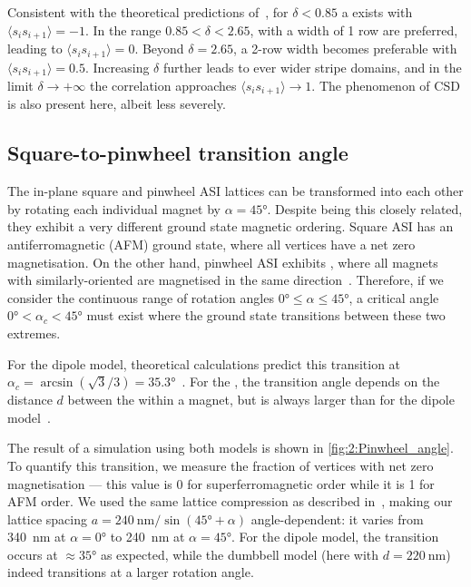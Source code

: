 Consistent with the theoretical predictions of~, for $\delta < 0.85$ a  exists with $\langle s_i s_{i+1} \rangle = -1$.
In the range $0.85 < \delta < 2.65$,  with a width of 1 row are preferred, leading to $\langle s_i s_{i+1} \rangle = 0$.
Beyond $\delta=2.65$, a 2-row width becomes preferable with $\langle s_i s_{i+1} \rangle = 0.5$.
Increasing $\delta$ further leads to ever wider stripe domains, and in the limit $\delta \rightarrow +\infty$ the correlation approaches $\langle s_i s_{i+1} \rangle \rightarrow 1$.
The phenomenon of CSD is also present here, albeit less severely.

\subsection{Square-to-pinwheel transition angle}\label{sec:2:Verification_IP_SquarePinwheel}
The in-plane square and pinwheel ASI lattices can be transformed into each other by rotating each individual magnet by $\alpha = \ang{45}$.
Despite being this closely related, they exhibit a very different ground state magnetic ordering.
Square ASI has an antiferromagnetic (AFM) ground state, where all vertices have a net zero magnetisation.
On the other hand, pinwheel ASI exhibits , where all magnets with similarly-oriented  are magnetised in the same direction~\cite{ApparentFMpinwheel}.
Therefore, if we consider the continuous range of rotation angles $\ang{0} \leq \alpha \leq \ang{45}$, a critical angle $\ang{0} < \alpha_c < \ang{45}$ must exist where the ground state transitions between these two extremes. \par
For the dipole model, theoretical calculations predict this transition at $\alpha_c = \arcsin(\sqrt{3}/3) = \ang{35.3}$~\cite{AFM-FM-transition-Pinwheel,MagicAngle}.
For the , the transition angle depends on the distance $d$ between the  within a magnet, but is always larger than for the dipole model~\cite{AFM-FM-transition-Pinwheel}. \\\par

The result of a \hotspice simulation using both models is shown in \cref{fig:2:Pinwheel_angle}.
To quantify this transition, we measure the fraction of vertices with net zero magnetisation --- this value is 0 for superferromagnetic order while it is 1 for AFM order.
We used the same lattice compression as described in~, making our lattice spacing $a=\SI{240}{\nano\metre} / \sin(\ang{45}+\alpha)$ angle-dependent: it varies from \SI{340}{\nano\metre} at $\alpha=\ang{0}$ to \SI{240}{\nano\metre} at $\alpha=\ang{45}$. 
For the dipole model, the transition occurs at $\approx \ang{35}$ as expected, while the dumbbell model (here with $d = \SI{220}{\nano\metre}$) indeed transitions at a larger rotation angle.

